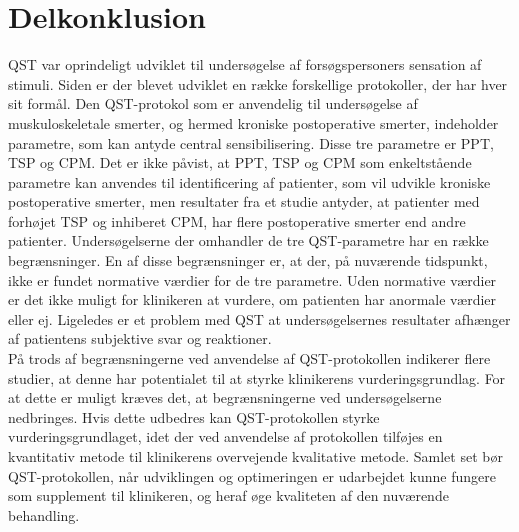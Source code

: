 \section{Delkonklusion}
QST var oprindeligt udviklet til undersøgelse af forsøgspersoners sensation af stimuli. Siden er der blevet udviklet en række forskellige protokoller, der har hver sit formål. Den QST-protokol som er anvendelig til undersøgelse af muskuloskeletale smerter, og hermed kroniske postoperative smerter, indeholder parametre, som kan antyde central sensibilisering. Disse tre parametre er PPT, TSP og CPM. Det er ikke påvist, at PPT, TSP og CPM som enkeltstående parametre kan anvendes til identificering af patienter, som vil udvikle kroniske postoperative smerter, men resultater fra et studie antyder, at patienter med forhøjet TSP og inhiberet CPM, har flere postoperative smerter end andre patienter. Undersøgelserne der omhandler de tre QST-parametre har en række begrænsninger. En af disse begrænsninger er, at der, på nuværende tidspunkt, ikke er fundet normative værdier for de tre parametre. Uden normative værdier er det ikke muligt for klinikeren at vurdere, om patienten har anormale værdier eller ej. Ligeledes er et problem med QST at undersøgelsernes resultater afhænger af patientens subjektive svar og reaktioner. \\
På trods af begrænsningerne ved anvendelse af QST-protokollen indikerer flere studier, at denne har potentialet til at styrke klinikerens vurderingsgrundlag. For at dette er muligt kræves det, at begrænsningerne ved undersøgelserne nedbringes. Hvis dette udbedres kan QST-protokollen styrke vurderingsgrundlaget, idet der ved anvendelse af protokollen tilføjes en kvantitativ metode til klinikerens overvejende kvalitative metode. Samlet set bør QST-protokollen, når udviklingen og optimeringen er udarbejdet kunne fungere som supplement til klinikeren, og heraf øge kvaliteten af den nuværende behandling.



